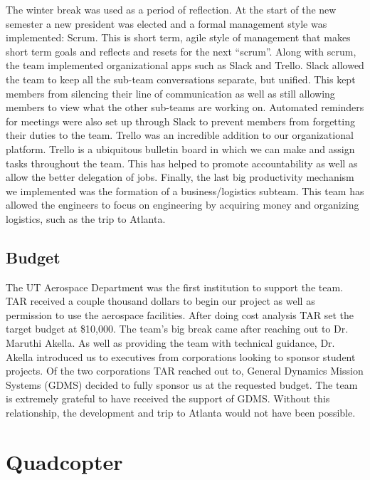 \documentclass[12pt]{article}
\begin{document}
The winter break was used as a period of reflection. At the start of the new semester a new president was elected and a formal management style was implemented: Scrum. This is short term, agile style of management that makes short term goals and reflects and resets for the next “scrum”. Along with scrum, the team implemented organizational apps such as Slack and Trello. Slack allowed the team to keep all the sub-team conversations separate, but unified. This kept members from silencing their line of communication as well as still allowing members to view what the other sub-teams are working on. Automated reminders for meetings were also set up through Slack to prevent members from forgetting their duties to the team. Trello was an incredible addition to our organizational platform. Trello is a ubiquitous bulletin board in which we can make and assign tasks throughout the team. This has helped to promote accountability as well as allow the better delegation of jobs. Finally, the last big productivity mechanism we implemented was the formation of a business/logistics subteam. This team has allowed the engineers to focus on engineering by acquiring money and organizing logistics, such as the trip to Atlanta. 

\subsection{Budget}
The UT Aerospace Department was the first institution to support the team. TAR received a couple thousand dollars to begin our project as well as permission to use the aerospace facilities. After doing cost analysis TAR set the target budget at \$10,000. The team’s big break came after reaching out to Dr. Maruthi Akella. As well as providing the team with technical guidance, Dr. Akella introduced us to executives from corporations looking to sponsor student projects. Of the two corporations TAR reached out to, General Dynamics Mission Systems (GDMS) decided to fully sponsor us at the requested budget. The team is extremely grateful to have received the support of GDMS. Without this relationship, the development and trip to Atlanta would not have been possible. 

\section{Quadcopter}
\end{document}
